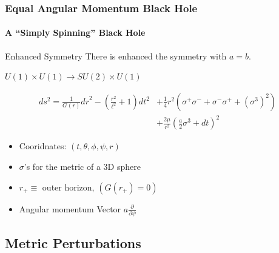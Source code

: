\documentclass[xcolor=dvipsnames]{beamer}
\begin{document}
\begin{frame}[squeeze]
  \frametitle{Equal Angular Momentum Black Hole}
  \framesubtitle{A ``Simply Spinning'' Black Hole}

  \begin{block}{Enhanced Symmetry}
    There is enhanced the symmetry with $a=b$.
    \begin{center}$U(1)\times U(1) \longrightarrow SU(2)\times U(1)$ \end{center}
  \end{block}

  \begin{equation*}
    \begin{aligned}
      d s^2=\frac 1{G(r)}{dr}^2-\left(\frac{r^2}{\ell^2}+1\right)dt^2&+\frac 14 r^2 \left(\sigma^+ \sigma^- +\sigma^- \sigma^+ +(\sigma^3)^2\right) \\ &+\frac{2 \mu  }{r^2} \left(\frac a2 \sigma^3+dt\right)^2
    \end{aligned}
  \end{equation*}

  \begin{itemize}
    \item Cooridnates: $(t, \theta, \phi, \psi, r)$
    \item $\sigma$'s for the metric of a 3D sphere
    \item $r_+ \equiv$ outer horizon, $\left(G(r_+)=0\right)$
    \item Angular momentum Vector $a\frac\partial{\partial\psi}$
  \end{itemize}

\end{frame}

\subsection{Metric Perturbations}
\end{document}
